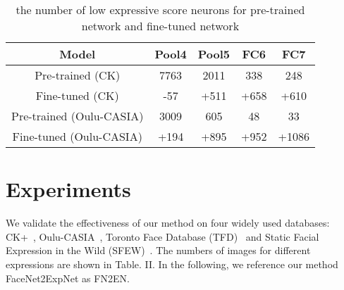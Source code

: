 \documentclass[a4paper, 10pt, conference]{ieeeconf}      %
\begin{document}
\begin{table}
\caption{the number of low expressive score neurons for pre-trained network and fine-tuned network}
\label{table_example}
\begin{center}
\begin{tabular}{|c||c||c||c||c|}
\hline
 Model &  Pool4 & Pool5 & FC6 & FC7  \\
\hline
Pre-trained (CK)& 7763 & 2011 & 338 & 248\\
Fine-tuned (CK)& -57 & +511 & +658 & +610\\
\hline
Pre-trained  (Oulu-CASIA)& 3009 & 605 & 48 & 33 \\
Fine-tuned (Oulu-CASIA)& +194 & +895 & +952 & +1086 \\
\hline
\end{tabular}
\end{center}
\vspace{-1mm}
\end{table}


\section{Experiments}
We validate the effectiveness of our method on four widely used databases: CK+~\cite{lucey2010extended}, Oulu-CASIA~\cite{zhao2011facial}, Toronto Face Database (TFD)~\cite{susskind2010toronto} and Static Facial Expression in the Wild (SFEW)~\cite{dhall2015video}.  The numbers of images for different expressions are shown in Table. II. 
In the following, we reference our method FaceNet2ExpNet as FN2EN.
\begin{table}
\caption{the number of images for different expression classes}
\label{table_example}
\begin{center}
\vspace{-1mm}
\end{center}
\end{table}
\end{document}
